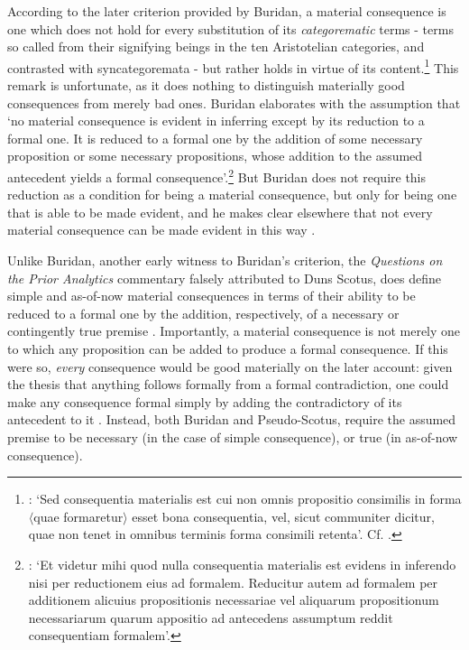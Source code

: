 \documentclass[]{article}
\begin{document}
According to the later criterion provided by Buridan, a material consequence is one which does not hold for every substitution of its \textit{categorematic} terms - terms so called from their signifying beings in the ten Aristotelian categories, and contrasted with syncategoremata - but rather holds in virtue of its content.\footnote{\autocite[I, c. 4, p. 23.10-13]{BuridanTC}: `Sed consequentia materialis est cui non omnis propositio consimilis in forma $\langle$quae formaretur$\rangle$ esset bona consequentia, vel, sicut communiter dicitur, quae non tenet in omnibus terminis forma consimili retenta'. Cf.  \autocite[I, q. 10, p. 105]{Pseudo-Scotus1891}.} This remark is unfortunate, as it does nothing to distinguish materially good consequences from merely bad ones. Buridan elaborates with the assumption that `no material consequence is evident in inferring except by its reduction to a formal one. It is reduced to a formal one by the addition of some necessary proposition or some necessary propositions, whose addition to the assumed antecedent yields a formal consequence'.\footnote{\autocite[I. c. 4, p. 23.15-19]{BuridanTC}: `Et videtur mihi quod nulla consequentia materialis est evidens in inferendo nisi per reductionem eius ad formalem. Reducitur autem ad formalem per additionem alicuius propositionis necessariae vel aliquarum propositionum necessariarum quarum appositio ad antecedens assumptum reddit consequentiam formalem'.} But Buridan does not require this reduction as a condition for being a material consequence, but only for being one that is able to be made evident, and he makes clear elsewhere that not every material consequence can be made evident in this way \autocite[338]{Klima2016}. 

Unlike Buridan, another early witness to Buridan's criterion, the \textit{Questions on the Prior Analytics} commentary falsely attributed to Duns Scotus, does define simple and as-of-now material consequences in terms of their ability to be reduced to a formal one by the addition, respectively, of a necessary or contingently true premise \autocite[I, q. 10, p. 105]{Pseudo-Scotus1891}. Importantly, a material consequence is not merely one to which any proposition can be added to produce a formal consequence. If this were so, \textit{every} consequence would be good materially on the later account: given the thesis that anything follows formally from a formal contradiction, one could make any consequence formal simply by adding the contradictory of its antecedent to it \autocite[I, c. 8, p. 36.160-37.181]{BuridanTC}. Instead, both Buridan and Pseudo-Scotus, require the assumed premise to be necessary (in the case of simple consequence), or true (in as-of-now consequence).
\end{document}
